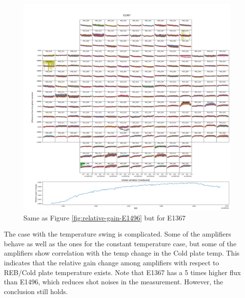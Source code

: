 \begin{figure}[ht]
    \centering
    \includegraphics[width=1\linewidth]{figures/gaintemp/E1367gainoverall_global.png}
    \caption{Same as Figure \ref{fig:relative-gain-E1496} but for E1367}
    \label{fig:relative-gain-E1367}
\end{figure} 
The case with the temperature swing is complicated. Some of the amplifiers behave as well as the ones for the constant temperature case, but some of the amplifiers show correlation with the temp change in the Cold plate temp. This indicates that the relative gain change among amplifiers with respect to REB/Cold plate temperature exists. 
Note that E1367 has a 5 times higher flux than E1496, which reduces shot noises in the measurement. However, the conclusion still holds. 

